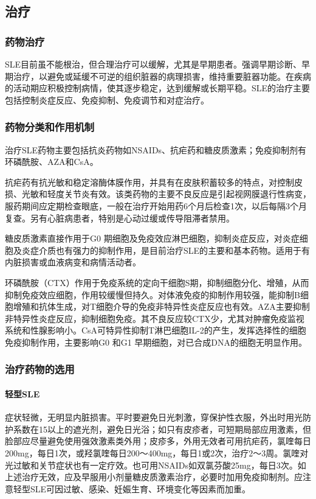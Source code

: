 \subsection{治疗}

\subsubsection{药物治疗}

SLE目前虽不能根治，但合理治疗可以缓解，尤其是早期患者。强调早期诊断、早期治疗，以避免或延缓不可逆的组织脏器的病理损害，维持重要脏器功能。在疾病的活动期应积极控制病情，使其逐步稳定，达到缓解或长期平稳。SLE的治疗主要包括控制炎症反应、免疫抑制、免疫调节和对症治疗。

\subsubsection{药物分类和作用机制}

治疗SLE药物主要包括抗炎药物如NSAIDs、抗疟药和糖皮质激素；免疫抑制剂有环磷酰胺、AZA和CsA。

抗疟药有抗光敏和稳定溶酶体膜作用，并具有在皮肤积蓄较多的特点，对控制皮损、光敏和轻度关节炎有效。该类药物的主要不良反应是引起视网膜退行性病变，服药期间应定期检查眼底，一般在治疗开始用药6个月后检查1次，以后每隔3个月复查。另有心脏病患者，特别是心动过缓或传导阻滞者禁用。

糖皮质激素直接作用于G{0}
期细胞及免疫效应淋巴细胞，抑制炎症反应，对炎症细胞及炎症介质也有强力的抑制作用，是目前治疗SLE的主要和基本药物。适用于有内脏损害或血液病变和病情活动者。

环磷酰胺（CTX）作用于免疫系统的定向干细胞S期，抑制细胞分化、增殖，从而抑制免疫效应细胞，作用较缓慢但持久。对体液免疫的抑制作用较强，能抑制B细胞增殖和抗体生成，对T细胞介导的免疫非特异性炎症反应也有效。AZA主要抑制非特异性炎症反应，抑制细胞免疫。其不良反应较CTX少，尤其对肿瘤免疫监视系统和性腺影响小。CsA可特异性抑制T淋巴细胞IL-2的产生，发挥选择性的细胞免疫抑制作用，主要影响G{0}
和G{1} 早期细胞，对已合成DNA的细胞无明显作用。

\subsubsection{治疗药物的选用}
\paragraph{轻型SLE}

症状轻微，无明显内脏损害。平时要避免日光刺激，穿保护性衣服，外出时用光防护系数在15以上的遮光剂，避免日光浴；如只有皮疹者，可短期局部应用激素，但脸部应尽量避免使用强效激素类外用；皮疹多，外用无效者可用抗疟药，氯喹每日200mg，每日1次，或羟氯喹每日200～400mg，每日1或2次，治疗2～3周。氯喹对光过敏和关节症状也有一定疗效。也可用NSAIDs如双氯芬酸25mg，每日3次。如上述治疗无效，应及早服用小剂量糖皮质激素治疗，必要时加用免疫抑制剂。应注意轻型SLE可因过敏、感染、妊娠生育、环境变化等因素而加重。
